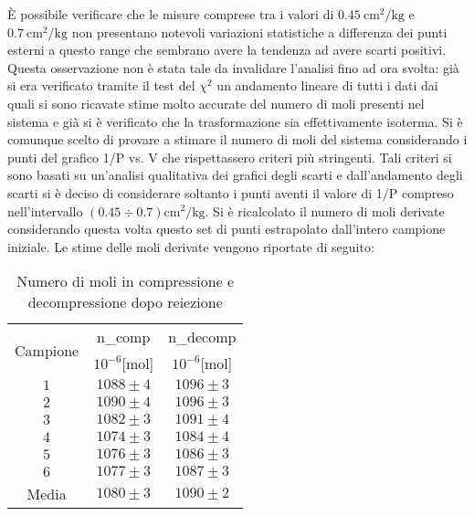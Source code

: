\documentclass[a4paper,11pt,oneside]{article}
\begin{document}
È possibile verificare che le misure comprese tra i valori di $\SI{0.45}{\centi\meter\squared\per\kilogram}$ e $\SI{0.7}{\centi\meter\squared\per\kilogram}$ non presentano notevoli variazioni statistiche a differenza dei punti esterni a questo range che sembrano avere la tendenza ad avere scarti positivi. Questa osservazione non è stata tale da invalidare l'analisi fino ad ora svolta: già si era verificato tramite il test del $\chi^{2}$ un andamento lineare di tutti i dati dai quali si sono ricavate stime molto accurate del numero di moli presenti nel sistema e già si è verificato che la trasformazione sia effettivamente isoterma. Si è comunque scelto di provare a stimare il numero di moli del sistema considerando i punti del grafico 1/P vs. V che rispettassero criteri più stringenti. Tali criteri si sono basati su un'analisi qualitativa dei grafici degli scarti e dall'andamento degli scarti si è deciso di considerare soltanto i punti aventi il valore di 1/P compreso nell'intervallo $(0.45 \div 0.7) \si{\centi\meter\squared\per\kilogram}$. Si è ricalcolato il numero di moli derivate considerando questa volta questo set di punti estrapolato dall'intero campione iniziale. Le stime delle moli derivate vengono riportate di seguito:

\begin{table}[h!]
    \centering
    \begin{tabular}{|c|c|c|}
        \hline
        \multirow{2}{*}{Campione} & n_{comp} & n_{decomp}\\ 
        & $10^{-6}$[mol] & $10^{-6}$[mol]\\ \hline
        \rowcolor[rgb]{0.85,0.85,0.85}$1$ & $1088\pm4$ & $1096\pm3$\\ \hline
        $2$ & $1090\pm4$ & $1096\pm3$\\ \hline
        \rowcolor[rgb]{0.85,0.85,0.85}$3$ & $1082\pm3$ & $1091\pm4$\\ \hline
        $4$ & $1074\pm3$ & $1084\pm4$\\ \hline
        \rowcolor[rgb]{0.85,0.85,0.85}$5$ & $1076\pm3$ & $1086\pm3$\\ \hline	
        $6$ & $1077\pm3$ & $1087\pm3$\\ \hline
        \rowcolor[rgb]{0.85,0.85,0.85}Media & $1080\pm3$ & $1090\pm2$\\ \hline
    \end{tabular}
    \caption{Numero di moli in compressione e decompressione dopo reiezione}
    \label{tab:moli_compress_decompress_reiez}
\end{table}
\end{document}

